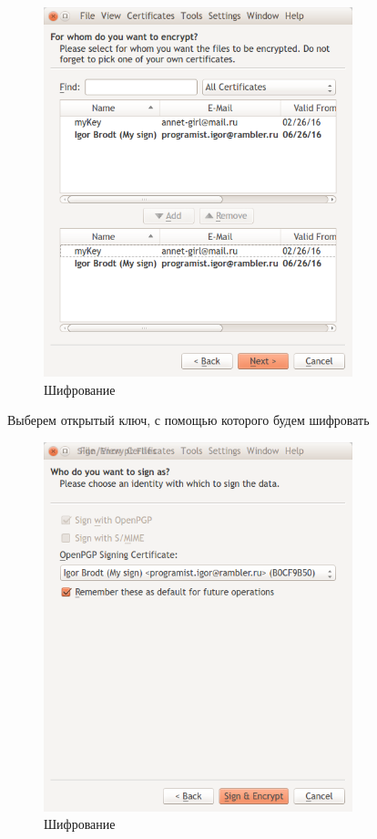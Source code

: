 \begin{figure}[H]
	\centering
	\includegraphics[width=0.8\textwidth]{images/12.png}
	\caption{Шифрование}
\end{figure}

Выберем открытый ключ, с помощью которого будем шифровать

\begin{figure}[H]
	\centering
	\includegraphics[width=0.8\textwidth]{images/13.png}
	\caption{Шифрование}
\end{figure}

